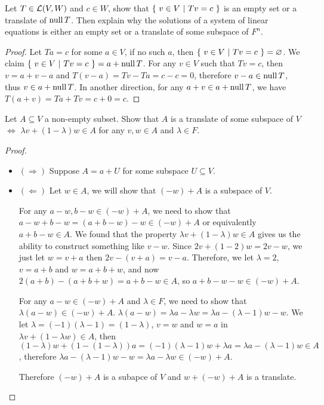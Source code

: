 \documentclass[../main.tex]{subfiles}
\begin{document}
\begin{exercise}
  Let $T \in \mathcal{L}(V, W)$ and $c \in W$, show that $\{ \ v \in V \ | \ Tv = c \ \}$ is an empty set
  or a translate of $\operatorname{null} T$. Then explain why the solutions of a system of linear equations
  is either an empty set or a translate of some subspace of $F^n$.
\end{exercise}
\begin{proof}
  Let $Ta = c$ for some $a \in V$, if no such $a$, then $\{ \ v \in V \ | \ Tv = c \ \} = \varnothing$.
  We claim $\{ \ v \in V \ | \ Tv = c \ \} = a + \operatorname{null} T$.
  For any $v \in V$ such that $Tv = c$, then $v = a + v - a$ and
  $T(v - a) = Tv - Ta = c - c = 0$, therefore $v - a \in \operatorname{null} T$,
  thus $v \in a + \operatorname{null} T$.
  In another direction, for any $a + v \in a + \operatorname{null} T$, we have $T(a + v) = Ta + Tv = c + 0 = c$.
\end{proof}

\begin{exercise}
  Let $A \subseteq V$ a non-empty subset.
  Show that $A$ is a translate of some subspace of $V$ $\iff$
  $\lambda v + (1 - \lambda) w  \in A$ for any $v, w \in A$ and $\lambda \in F$.
\end{exercise}
\begin{proof}
  ~
  \begin{itemize}
    \item $(\Rightarrow)$ Suppose $A = a + U$ for some subspace $U \subseteq V$.
    \item $(\Leftarrow)$ Let $w \in A$, we will show that $(-w) + A$ is a subspace of $V$.
    
          For any $a - w, b - w \in (- w) + A$, we need to show that $a - w + b - w = (a + b - w) - w \in (-w) + A$
          or equivalently $a + b - w \in A$. We found that the property $\lambda v + (1 - \lambda) w \in A$
          gives us the ability to construct something like $v - w$. Since $2v + (1 - 2)w = 2v - w$,
          we just let $w = v + a$ then $2v - (v + a) = v - a$. Therefore, we let $\lambda = 2$, $v = a + b$ and $w = a + b + w$,
          and now $2(a + b) - (a + b + w) = a + b - w \in A$, so $a + b - w - w \in (-w) + A$.

          For any $a - w \in (- w) + A$ and $\lambda \in F$, we need to show that
          $\lambda (a - w) \in (- w) + A$.
          $\lambda (a - w) = \lambda a - \lambda w = \lambda a - (\lambda - 1) w - w$.
          We let $\lambda = (- 1) (\lambda - 1) = (1 - \lambda)$, $v = w$ and $w = a$
          in $\lambda v + (1 - \lambda w) \in A$, then $(1 - \lambda) w + (1 - (1 - \lambda)) a = (-1) (\lambda - 1) w + \lambda a = \lambda a - (\lambda - 1) w \in A$,
          therefore $\lambda a - (\lambda - 1) w - w = \lambda a - \lambda w \in (- w) + A$.

          Therefore $(- w) + A$ is a subapce of $V$ and $w + (- w) + A$ is a translate.
  \end{itemize}
\end{proof}
\end{document}
